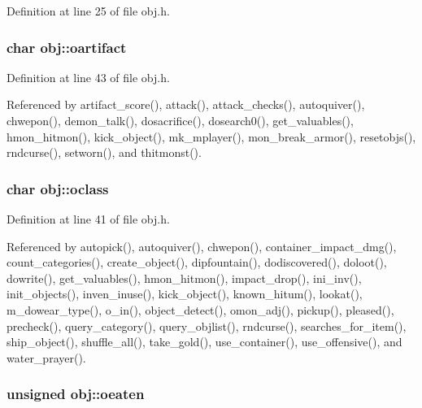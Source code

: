 Definition at line 25 of file obj.\+h.

\hypertarget{structobj_af03ce8a6a0ca51e8d8954fb1a1a31fbe}{
\subsubsection[{oartifact}]{\setlength{\rightskip}{0pt plus 5cm}char obj\+::oartifact}}\label{structobj_af03ce8a6a0ca51e8d8954fb1a1a31fbe}


Definition at line 43 of file obj.\+h.



Referenced by artifact\+\_\+score(), attack(), attack\+\_\+checks(), autoquiver(), chwepon(), demon\+\_\+talk(), dosacrifice(), dosearch0(), get\+\_\+valuables(), hmon\+\_\+hitmon(), kick\+\_\+object(), mk\+\_\+mplayer(), mon\+\_\+break\+\_\+armor(), resetobjs(), rndcurse(), setworn(), and thitmonst().

\hypertarget{structobj_a716ba3ee00602dede9ea5c68c74d45bd}{
\subsubsection[{oclass}]{\setlength{\rightskip}{0pt plus 5cm}char obj\+::oclass}}\label{structobj_a716ba3ee00602dede9ea5c68c74d45bd}


Definition at line 41 of file obj.\+h.



Referenced by autopick(), autoquiver(), chwepon(), container\+\_\+impact\+\_\+dmg(), count\+\_\+categories(), create\+\_\+object(), dipfountain(), dodiscovered(), doloot(), dowrite(), get\+\_\+valuables(), hmon\+\_\+hitmon(), impact\+\_\+drop(), ini\+\_\+inv(), init\+\_\+objects(), inven\+\_\+inuse(), kick\+\_\+object(), known\+\_\+hitum(), lookat(), m\+\_\+dowear\+\_\+type(), o\+\_\+in(), object\+\_\+detect(), omon\+\_\+adj(), pickup(), pleased(), precheck(), query\+\_\+category(), query\+\_\+objlist(), rndcurse(), searches\+\_\+for\+\_\+item(), ship\+\_\+object(), shuffle\+\_\+all(), take\+\_\+gold(), use\+\_\+container(), use\+\_\+offensive(), and water\+\_\+prayer().

\hypertarget{structobj_a51ce2f2a33e9c10a4698b75bd7d030c0}{
\subsubsection[{oeaten}]{\setlength{\rightskip}{0pt plus 5cm}unsigned obj\+::oeaten}}\label{structobj_a51ce2f2a33e9c10a4698b75bd7d030c0}


